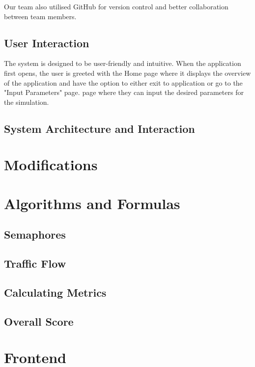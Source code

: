 \documentclass{article}
\begin{document}
        Our team also utilised GitHub for version control and better collaboration between team members.

    \subsection{User Interaction}

        The system is designed to be user-friendly and intuitive. When the application first opens, the user is greeted with the Home page where it displays the overview of the application and have the option to either exit to application or go to the "Input Parameters" page.
        page where they can input the desired parameters for the simulation.
        
    \subsection{System Architecture and Interaction}

\section{Modifications}

\section{Algorithms and Formulas}

    \subsection{Semaphores}

    \subsection{Traffic Flow}

    \subsection{Calculating Metrics}

    \subsection{Overall Score}

\section{Frontend}
\end{document}
